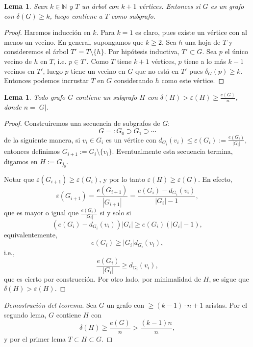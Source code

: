 \documentclass[12pt]{report}
\theoremstyle{plain}
\newtheorem{lemma}[theorem]{Lema}
\theoremstyle{definition}
\newcommand{\naturals}{\mathbb{N}}
\newcommand{\abs}[1]{\left \vert #1 \right \vert}
\begin{document}
\begin{lemma}\label{lemma:si G contiene un vertice de grado almenos k entonces contiene un arbol T con k + 1 vertices}
Sean $k \in \naturals$ y $T$ un árbol con $k+1$ vértices. Entonces si $G$ es un grafo con $\delta (G) \geq k$, luego contiene a $T$ como subgrafo.
\end{lemma}
\begin{proof}
Haremos inducción en $k$. Para $k = 1$ es claro, pues existe un vértice con al menos un vecino. En general, supongamos que $k \geq 2$. Sea $h$ una hoja de $T$ y consideremos el árbol $T' = T \setminus \{h\}$. Por hipótesis inductiva, $T' \subset G$. Sea $p$ el único vecino de $h$ en $T$, i.e. $p \in T'$. Como $T$ tiene $k+1$ vértices, $p$ tiene a lo más $k-1$ vecinos en $T'$, luego $p$ tiene un vecino en $G$ que no está en $T'$ pues $\delta_G (p) \geq k$. Entonces podemos incrustar $T$ en $G$ considerando $h$ como este vértice.
\end{proof}

\begin{lemma}\label{lema:lema 2 - teorema de extremalidad de arboles}
Todo grafo $G$ contiene un subgrafo $H$ con $\delta (H) > \varepsilon (H) \geq \frac{e(G)}{n}$, donde $n = \abs G$.
\end{lemma}
\begin{proof}
Construiremos una secuencia de subgrafos de $G$:
\[
    G =: G_0 \supset G_1 \supset \cdots
\]
de la siguiente manera, si $v_i \in G_i$ es un vértice con $d_{G_i} (v_i) \leq \varepsilon (G_i) := \frac{e(G_i)}{\abs{G_i}}$, entonces definimos $G_{i+1} := G_i \setminus \{v_i\}$. Eventualmente esta secuencia termina, digamos en $H := G_{j_0}$.

Notar que $\varepsilon (G_{i+1}) \geq \varepsilon (G_i)$, y por lo tanto $\varepsilon (H) \geq \varepsilon (G)$. En efecto,
\[
    \varepsilon (G_{i+1}) = \frac{e(G_{i+1})}{\abs{G_{i+1}}} = \frac{e(G_i) - d_{G_i} (v_i)}{\abs{G_i} - 1},
\]
que es mayor o igual que $\frac{e(G_i)}{\abs{G_i}}$ si y solo si
\[
    (e(G_i) - d_{G_i} (v_i)) \abs{G_i} \geq e(G_i)(\abs{G_i} - 1),
\]
equivalentemente,
\[
    e(G_i) \geq \abs{G_i} d_{G_i} (v_i),
\]
i.e.,
\[
    \frac{e(G_i)}{\abs{G_i}} \geq d_{G_i} (v_i),
\]
que es cierto por construcción. Por otro lado, por minimalidad de $H$, se sigue que $\delta (H) > \varepsilon (H)$.
\end{proof}

\begin{proof}[Demostración del teorema]
Sea $G$ un grafo con $\geq (k-1) \cdot n + 1$ aristas. Por el segundo lema, $G$ contiene $H$ con
\[
    \delta (H) \geq \frac{e(G)}{n} > \frac{(k-1) n}{n},
\]
y por el primer lema $T \subset H \subset G$.
\end{proof}
\end{document}
